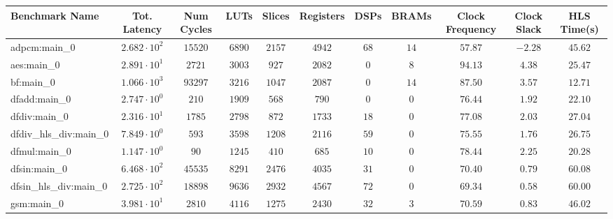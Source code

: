\begin{tabular}{|l|c|c|c|c|c|c|c|c|c|c|}
\hline
Benchmark Name          & Tot. Latency           & Num Cycles & LUTs      & Slices    & Registers & DSPs    & BRAMs   & Clock Frequency & Clock Slack & HLS Time(s) \\
\hline
adpcm:main\_0           & $ 2.682 \cdot 10^{2} $ & $ 15520  $ & $ 6890  $ & $ 2157  $ & $ 4942  $ & $ 68  $ & $ 14  $ & $ 57.87       $ & $ -2.28   $ & $ 45.62   $ \\
aes:main\_0             & $ 2.891 \cdot 10^{1} $ & $ 2721   $ & $ 3003  $ & $ 927   $ & $ 2082  $ & $ 0   $ & $ 8   $ & $ 94.13       $ & $ 4.38    $ & $ 25.47   $ \\
bf:main\_0              & $ 1.066 \cdot 10^{3} $ & $ 93297  $ & $ 3216  $ & $ 1047  $ & $ 2087  $ & $ 0   $ & $ 14  $ & $ 87.50       $ & $ 3.57    $ & $ 12.71   $ \\
dfadd:main\_0           & $ 2.747 \cdot 10^{0} $ & $ 210    $ & $ 1909  $ & $ 568   $ & $ 790   $ & $ 0   $ & $ 0   $ & $ 76.44       $ & $ 1.92    $ & $ 22.10   $ \\
dfdiv:main\_0           & $ 2.316 \cdot 10^{1} $ & $ 1785   $ & $ 2798  $ & $ 872   $ & $ 1733  $ & $ 18  $ & $ 0   $ & $ 77.08       $ & $ 2.03    $ & $ 27.04   $ \\
dfdiv\_hls\_div:main\_0 & $ 7.849 \cdot 10^{0} $ & $ 593    $ & $ 3598  $ & $ 1208  $ & $ 2116  $ & $ 59  $ & $ 0   $ & $ 75.55       $ & $ 1.76    $ & $ 26.75   $ \\
dfmul:main\_0           & $ 1.147 \cdot 10^{0} $ & $ 90     $ & $ 1245  $ & $ 410   $ & $ 685   $ & $ 10  $ & $ 0   $ & $ 78.44       $ & $ 2.25    $ & $ 20.28   $ \\
dfsin:main\_0           & $ 6.468 \cdot 10^{2} $ & $ 45535  $ & $ 8291  $ & $ 2476  $ & $ 4035  $ & $ 31  $ & $ 0   $ & $ 70.40       $ & $ 0.79    $ & $ 60.08   $ \\
dfsin\_hls\_div:main\_0 & $ 2.725 \cdot 10^{2} $ & $ 18898  $ & $ 9636  $ & $ 2932  $ & $ 4567  $ & $ 72  $ & $ 0   $ & $ 69.34       $ & $ 0.58    $ & $ 60.00   $ \\
gsm:main\_0             & $ 3.981 \cdot 10^{1} $ & $ 2810   $ & $ 4116  $ & $ 1275  $ & $ 2430  $ & $ 32  $ & $ 3   $ & $ 70.59       $ & $ 0.83    $ & $ 46.02   $ \\

\end{tabular}
